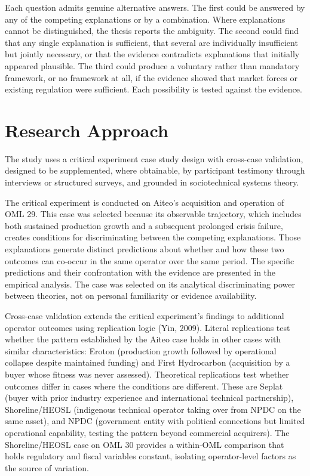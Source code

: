 Each question admits genuine alternative answers. The first could be
answered by any of the competing explanations or by a combination. Where
explanations cannot be distinguished, the thesis reports the ambiguity.
The second could find that any single explanation is sufficient, that
several are individually insufficient but jointly necessary, or that the
evidence contradicts explanations that initially appeared plausible. The
third could produce a voluntary rather than mandatory framework, or no
framework at all, if the evidence showed that market forces or existing
regulation were sufficient. Each possibility is tested against the
evidence.

\hypertarget{research-approach}{%
\section{Research Approach}\label{research-approach}}

The study uses a critical experiment case study design with cross-case
validation, designed to be supplemented, where obtainable, by
participant testimony through interviews or structured surveys, and
grounded in sociotechnical systems theory.

The critical experiment is conducted on Aiteo's acquisition and
operation of OML 29. This case was selected because its observable
trajectory, which includes both sustained production growth and a
subsequent prolonged crisis failure, creates conditions for
discriminating between the competing explanations. Those explanations
generate distinct predictions about whether and how these two outcomes
can co-occur in the same operator over the same period. The specific
predictions and their confrontation with the evidence are presented in
the empirical analysis. The case was selected on its analytical
discriminating power between theories, not on personal familiarity or
evidence availability.

Cross-case validation extends the critical experiment's findings to
additional operator outcomes using replication logic (Yin, 2009).
Literal replications test whether the pattern established by the Aiteo
case holds in other cases with similar characteristics: Eroton
(production growth followed by operational collapse despite maintained
funding) and First Hydrocarbon (acquisition by a buyer whose fitness was
never assessed). Theoretical replications test whether outcomes differ
in cases where the conditions are different. These are Seplat (buyer
with prior industry experience and international technical partnership),
Shoreline/HEOSL (indigenous technical operator taking over from NPDC on
the same asset), and NPDC (government entity with political connections
but limited operational capability, testing the pattern beyond
commercial acquirers). The Shoreline/HEOSL case on OML 30 provides a
within-OML comparison that holds regulatory and fiscal variables
constant, isolating operator-level factors as the source of variation.

